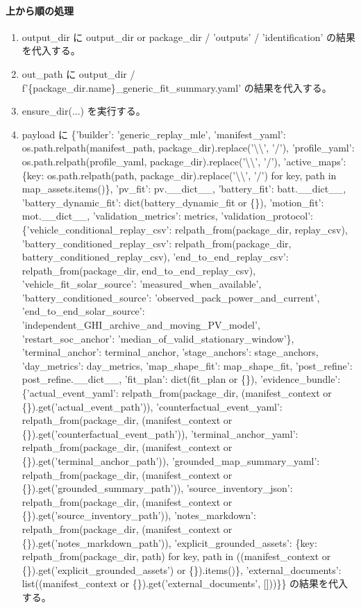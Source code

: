 \documentclass[a4paper,11pt]{article}
\begin{document}
            \paragraph{上から順の処理}
            \begin{enumerate}[leftmargin=1.8em]
            \item output\_dir に output\_dir or package\_dir / 'outputs' / 'identification' の結果を代入する。
\item out\_path に output\_dir / f'\{package\_dir.name\}\_generic\_fit\_summary.yaml' の結果を代入する。
\item ensure\_dir(...) を実行する。
\item payload に \{'builder': 'generic\_replay\_mle', 'manifest\_yaml': os.path.relpath(manifest\_path, package\_dir).replace('\textbackslash{}\textbackslash{}', '/'), 'profile\_yaml': os.path.relpath(profile\_yaml, package\_dir).replace('\textbackslash{}\textbackslash{}', '/'), 'active\_maps': \{key: os.path.relpath(path, package\_dir).replace('\textbackslash{}\textbackslash{}', '/') for key, path in map\_assets.items()\}, 'pv\_fit': pv.\_\_dict\_\_, 'battery\_fit': batt.\_\_dict\_\_, 'battery\_dynamic\_fit': dict(battery\_dynamic\_fit or \{\}), 'motion\_fit': mot.\_\_dict\_\_, 'validation\_metrics': metrics, 'validation\_protocol': \{'vehicle\_conditional\_replay\_csv': relpath\_from(package\_dir, replay\_csv), 'battery\_conditioned\_replay\_csv': relpath\_from(package\_dir, battery\_conditioned\_replay\_csv), 'end\_to\_end\_replay\_csv': relpath\_from(package\_dir, end\_to\_end\_replay\_csv), 'vehicle\_fit\_solar\_source': 'measured\_when\_available', 'battery\_conditioned\_source': 'observed\_pack\_power\_and\_current', 'end\_to\_end\_solar\_source': 'independent\_GHI\_archive\_and\_moving\_PV\_model', 'restart\_soc\_anchor': 'median\_of\_valid\_stationary\_window'\}, 'terminal\_anchor': terminal\_anchor, 'stage\_anchors': stage\_anchors, 'day\_metrics': day\_metrics, 'map\_shape\_fit': map\_shape\_fit, 'post\_refine': post\_refine.\_\_dict\_\_, 'fit\_plan': dict(fit\_plan or \{\}), 'evidence\_bundle': \{'actual\_event\_yaml': relpath\_from(package\_dir, (manifest\_context or \{\}).get('actual\_event\_path')), 'counterfactual\_event\_yaml': relpath\_from(package\_dir, (manifest\_context or \{\}).get('counterfactual\_event\_path')), 'terminal\_anchor\_yaml': relpath\_from(package\_dir, (manifest\_context or \{\}).get('terminal\_anchor\_path')), 'grounded\_map\_summary\_yaml': relpath\_from(package\_dir, (manifest\_context or \{\}).get('grounded\_summary\_path')), 'source\_inventory\_json': relpath\_from(package\_dir, (manifest\_context or \{\}).get('source\_inventory\_path')), 'notes\_markdown': relpath\_from(package\_dir, (manifest\_context or \{\}).get('notes\_markdown\_path')), 'explicit\_grounded\_assets': \{key: relpath\_from(package\_dir, path) for key, path in ((manifest\_context or \{\}).get('explicit\_grounded\_assets') or \{\}).items()\}, 'external\_documents': list((manifest\_context or \{\}).get('external\_documents', []))\}\} の結果を代入する。

\end{enumerate}
\end{document}
